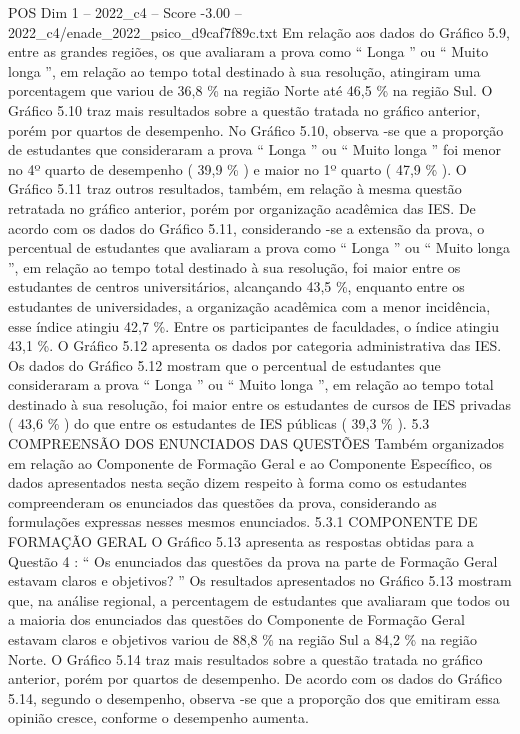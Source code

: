 \begin{textsample}{POS Dim 1 – 2022\_c4 – Score -3.00 – 2022\_c4/enade\_2022\_psico\_d9caf7f89c.txt}
Em relação aos dados do Gráfico 5.9, entre as grandes regiões, os que avaliaram a prova como “ Longa ” ou “ Muito longa ”, em relação ao tempo total destinado à sua resolução, atingiram uma porcentagem que variou de 36,8 \% na região Norte até 46,5 \% na região Sul.
O Gráfico 5.10 traz mais resultados sobre a questão tratada no gráfico anterior, porém por quartos de desempenho.
No Gráfico 5.10, observa -se que a proporção de estudantes que consideraram a prova “ Longa ” ou “ Muito longa ” foi menor no 4º quarto de desempenho ( 39,9 \% ) e maior no 1º quarto ( 47,9 \% ).
O Gráfico 5.11 traz outros resultados, também, em relação à mesma questão retratada no gráfico anterior, porém por organização acadêmica das IES.
De acordo com os dados do Gráfico 5.11, considerando -se a extensão da prova, o percentual de estudantes que avaliaram a prova como “ Longa ” ou “ Muito longa ”, em relação ao tempo total destinado à sua resolução, foi maior entre os estudantes de centros universitários, alcançando 43,5 \%, enquanto entre os estudantes de universidades, a organização acadêmica com a menor incidência, esse índice atingiu 42,7 \%.
Entre os participantes de faculdades, o índice atingiu 43,1 \%.
O Gráfico 5.12 apresenta os dados por categoria administrativa das IES.
Os dados do Gráfico 5.12 mostram que o percentual de estudantes que consideraram a prova “ Longa ” ou “ Muito longa ”, em relação ao tempo total destinado à sua resolução, foi maior entre os estudantes de cursos de IES privadas ( 43,6 \% ) do que entre os estudantes de IES públicas ( 39,3 \% ). 5.3 COMPREENSÃO DOS ENUNCIADOS DAS QUESTÕES Também organizados em relação ao Componente de Formação Geral e ao Componente Específico, os dados apresentados nesta seção dizem respeito à forma como os estudantes compreenderam os enunciados das questões da prova, considerando as formulações expressas nesses mesmos enunciados. 5.3.1 COMPONENTE DE FORMAÇÃO GERAL O Gráfico 5.13 apresenta as respostas obtidas para a Questão 4 : “ Os enunciados das questões da prova na parte de Formação Geral estavam claros e objetivos? ” Os resultados apresentados no Gráfico 5.13 mostram que, na análise regional, a percentagem de estudantes que avaliaram que todos ou a maioria dos enunciados das questões do Componente de Formação Geral estavam claros e objetivos variou de 88,8 \% na região Sul a 84,2 \% na região Norte.
O Gráfico 5.14 traz mais resultados sobre a questão tratada no gráfico anterior, porém por quartos de desempenho.
De acordo com os dados do Gráfico 5.14, segundo o desempenho, observa -se que a proporção dos que emitiram essa opinião cresce, conforme o desempenho aumenta.

\end{textsample}
